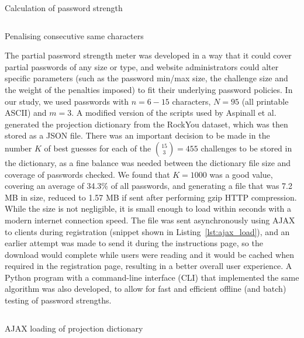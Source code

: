   \begin{listing}[htpb]
    \inputminted[linenos,frame=lines,baselinestretch=0.75,fontsize=\footnotesize]{js}{Snippets/calc_str.js}
    \caption{Calculation of password strength}
    \label{lst:calc_str}
  \end{listing}

  \begin{listing}[htpb]
    \inputminted[linenos,frame=lines,baselinestretch=0.75,fontsize=\footnotesize]{js}{Snippets/get_penalty.js}
    \caption{Penalising consecutive same characters}
    \label{lst:penalty}
  \end{listing}

  The partial password strength meter was developed in a way that it could cover partial passwords of any size or type, and website administrators could alter specific parameters (such as the password min/max size, the challenge size and the weight of the penalties imposed) to fit their underlying password policies. In our study, we used passwords with $n=6-15$ characters, $N=95$ (all printable ASCII) and $m=3$.
  A modified version of the scripts used by Aspinall et al.~\cite{part_pass} generated the projection dictionary from the RockYou dataset, which was then stored as a JSON file. There was an important decision to be made in the number $K$ of best guesses for each of the ${15 \choose 3} = 455$ challenges to be stored in the dictionary, as a fine balance was needed between the dictionary file size and coverage of passwords checked. We found that $K=1000$ was a good value, covering an average of 34.3\% of all passwords, and generating a file that was 7.2 MB in size, reduced to 1.57 MB if sent after performing gzip HTTP compression. While the size is not negligible, it is small enough to load within seconds with a modern internet connection speed. The file was sent asynchronously using AJAX to clients during registration (snippet shown in Listing~\ref{lst:ajax_load}), and an earlier attempt was made to send it during the instructions page, so the download would complete while users were reading and it would be cached when required in the registration page, resulting in a better overall user experience. A Python program with a command-line interface (CLI) that implemented the same algorithm was also developed, to allow for fast and efficient offline (and batch) testing of password strengths.

  \begin{listing}[htpb]
    \inputminted[linenos,frame=single,baselinestretch=0.75,fontsize=\footnotesize]{js}{Snippets/ajax.js}
    \caption{AJAX loading of projection dictionary}
    \label{lst:ajax_load}
  \end{listing}

